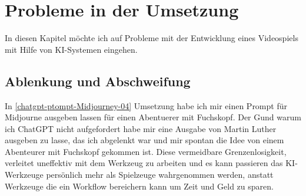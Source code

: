 \chapter{Probleme in der Umsetzung}
In diesen Kapitel möchte ich auf Probleme mit der Entwicklung eines Videospiels mit Hilfe von KI-Systemen eingehen.

\section{Ablenkung und Abschweifung}
In \ref{chatgpt-ptompt-Midjourney-04} Umsetzung habe ich mir einen Prompt für Midjourne ausgeben lassen für einen Abentuerer mit Fuchskopf. Der Gund warum ich ChatGPT nicht aufgefordert habe mir eine Ausgabe von Martin Luther ausgeben zu lasse, das ich abgelenkt war und mir spontan die Idee von einem Abenteurer mit Fuchskopf gekommen ist.
Diese vermeidbare Grenzenlosigkeit, verleitet uneffektiv mit dem Werkzeug zu arbeiten und es kann passieren das KI-Werkzeuge persönlich mehr als Spielzeuge wahrgenommen werden, anstatt Werkzeuge die ein Workflow bereichern kann um Zeit und Geld zu sparen.


